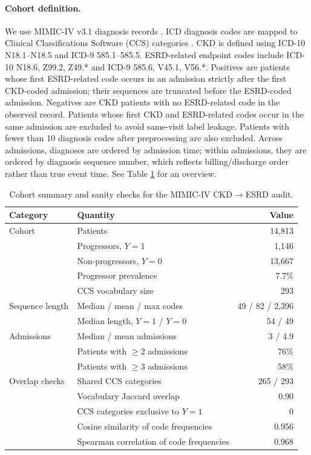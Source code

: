 \documentclass{article} %
\theoremstyle{plain}
\theoremstyle{definition}
\theoremstyle{remark}
\begin{document}
\paragraph{Cohort definition.}
We use MIMIC-IV v3.1 diagnosis records \citep{johnson2024mimiciv31,johnson2023mimiciv}. ICD diagnosis codes are mapped to Clinical Classifications Software (CCS) categories \citep{hcup_ccs}. CKD is defined using ICD-10 N18.1--N18.5 and ICD-9 585.1--585.5. ESRD-related endpoint codes include ICD-10 N18.6, Z99.2, Z49.* and ICD-9 585.6, V45.1, V56.*. Positives are patients whose first ESRD-related code occurs in an admission strictly after the first CKD-coded admission; their sequences are truncated before the ESRD-coded admission. Negatives are CKD patients with no ESRD-related code in the observed record. Patients whose first CKD and ESRD-related codes occur in the same admission are excluded to avoid same-visit label leakage. Patients with fewer than 10 diagnosis codes after preprocessing are also excluded. Across admissions, diagnoses are ordered by admission time; within admissions, they are ordered by diagnosis sequence number, which reflects billing/discharge order rather than true event time. See Table \ref{tab:mimic_ckd_cohort} for an overview.

\begin{table}[t]
\centering
\caption{Cohort summary and sanity checks for the MIMIC-IV CKD$\to$ESRD audit.}
\label{tab:mimic_ckd_cohort}
\small
\setlength{\tabcolsep}{5pt}
\begin{tabular}{@{}llr@{}}
\toprule
Category & Quantity & Value \\
\midrule
Cohort & Patients & 14,813 \\
       & Progressors, $Y=1$ & 1,146 \\
       & Non-progressors, $Y=0$ & 13,667 \\
       & Progressor prevalence & 7.7\% \\
       & CCS vocabulary size & 293 \\
\midrule
Sequence length & Median / mean / max codes & 49 / 82 / 2,396 \\
                & Median length, $Y=1$ / $Y=0$ & 54 / 49 \\
\midrule
Admissions & Median / mean admissions & 3 / 4.9 \\
           & Patients with $\geq2$ admissions & 76\% \\
           & Patients with $\geq3$ admissions & 58\% \\
\midrule
Overlap checks & Shared CCS categories & 265 / 293 \\
               & Vocabulary Jaccard overlap & 0.90 \\
               & CCS categories exclusive to $Y=1$ & 0 \\
               & Cosine similarity of code frequencies & 0.956 \\
               & Spearman correlation of code frequencies & 0.968 \\
\bottomrule
\end{tabular}
\end{table}
\end{document}
